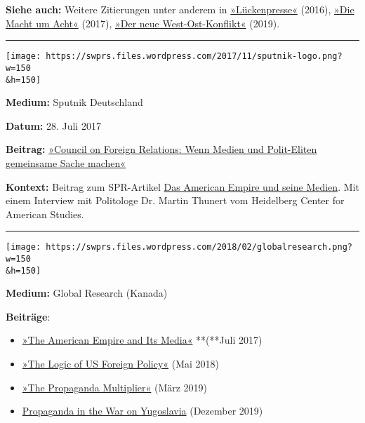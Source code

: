 \textbf{Siehe auch:} Weitere Zitierungen unter anderem in
\href{https://www.westendverlag.de/buch/lueckenpresse/}{»Lückenpresse«}
(2016),
\href{http://shop.papyrossa.de/Gellermann-Uli-Klinkhammer-Friedhelm-Braeutigam-Volker-Die-Macht-um-acht}{»Die
Macht um Acht«} (2017),
\href{https://zeitgeist-online.de/1080-wolfgang-bittner-der-neue-west-ost-konflikt.html}{»Der
neue West-Ost-Konflikt«} (2019).

\begin{center}\rule{0.5\linewidth}{\linethickness}\end{center}

\texttt{[image: https://swprs.files.wordpress.com/2017/11/sputnik-logo.png?w=150\\\&h=150]}

\textbf{Medium:} Sputnik Deutschland

\textbf{Datum:} 28. Juli 2017

\textbf{Beitrag:}
\href{https://de.sputniknews.com/panorama/20170728316790722-wenn-medien-und-politeliten-gemeinsam/}{»Council
on Foreign Relations: Wenn Medien und Polit-Eliten gemeinsame Sache
machen«}

\textbf{Kontext:} Beitrag zum SPR-Artikel
\href{https://swprs.org/das-american-empire-und-seine-medien/}{Das
American Empire und seine Medien}. Mit einem Interview mit Politologe
Dr. Martin Thunert vom Heidelberg Center for American Studies.

\begin{center}\rule{0.5\linewidth}{\linethickness}\end{center}

\texttt{[image: https://swprs.files.wordpress.com/2018/02/globalresearch.png?w=150\\\&h=150]}

\textbf{Medium:} Global Research (Kanada)

\textbf{Beiträge}:

\begin{itemize}
\tightlist
\item
  \href{http://www.globalresearch.ca/the-american-empire-and-its-media/5600442}{»The
  American Empire and Its Media«} **(**Juli 2017)
\item
  \href{https://www.globalresearch.ca/the-logic-of-u-s-foreign-policy/5642295}{»The
  Logic of US Foreign Policy«} (Mai 2018)
\item
  \href{https://www.globalresearch.ca/propaganda-multiplier-global-news-agencies-western-media-geopolitics/5670371}{»The
  Propaganda Multiplier«} (März 2019)
\item
  \href{https://www.globalresearch.ca/propaganda-war-yugoslavia/5698036}{Propaganda
  in the War on Yugoslavia} (Dezember 2019)
\end{itemize}

